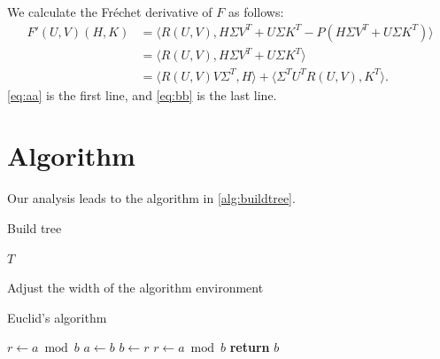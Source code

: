 \documentclass[openany,twoside,12pt]{book}
\theoremstyle{plain}
\numberwithin{equation}{chapter}
\numberwithin{figure}{chapter}
\numberwithin{table}{chapter}
\begin{document}
We calculate the Fr\'{e}chet derivative of $F$ as follows:
\begin{subequations}
\begin{align}
  F'(U,V)(H,K)
  &= \langle R(U,V),H\Sigma V^{T} + U\Sigma K^{T} -
  P(H\Sigma V^{T} + U\Sigma K^{T})\rangle \label{eq:aa} \\
  &= \langle R(U,V),H\Sigma V^{T} + U\Sigma K^{T}\rangle
  \nonumber \\
  &= \langle R(U,V)V\Sigma^{T},H\rangle +
  \langle \Sigma^{T}U^{T}R(U,V),K^{T}\rangle. \label{eq:bb}
\end{align}
\end{subequations}
\ref{eq:aa} is the first line, and \ref{eq:bb} is the last line.

\section{Algorithm}
\label{sec:alg}

Our analysis leads to the algorithm in \ref{alg:buildtree}.

\begin{algorithm}
\caption{Build tree}
\label{alg:buildtree}
\begin{algorithmic}
  \EndWhile
  \State \Return $T$
\end{algorithmic}
\end{algorithm}

\clearpage
Adjust the width of the algorithm environment
\begin{center}
\vspace{-2ex}
\begin{minipage}{0.9\linewidth}
\begin{algorithm}[H]
\caption{Euclid’s algorithm}
\label{alg:euclid}
\begin{algorithmic}[1] %
  \State $r \gets a \bmod b$
    \State $a \gets b$
    \State $b \gets r$
    \State $r \gets a \bmod b$
  \EndWhile\label{euclidendwhile}
  \State \textbf{return} $b$
\EndProcedure
\end{algorithmic}
\end{algorithm}
\end{minipage}
\end{center}
\end{document}
